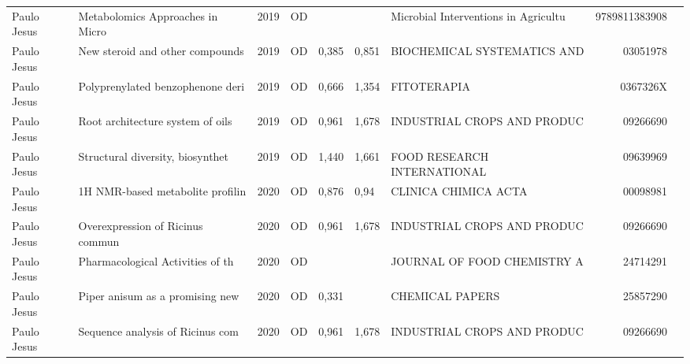 \documentclass[12pt,brazil]{article}\usepackage[]{graphicx}\usepackage[]{xcolor}
\begin{document}
\begin{longtable}{lllrrllrr}
Paulo Jesus & Metabolomics Approaches in Micro & 2019 & OD &  &  & Microbial Interventions in Agricultu & 9789811383908 \\
Paulo Jesus & New steroid and other compounds  & 2019 & OD & 0,385 & 0,851 & BIOCHEMICAL SYSTEMATICS AND & 03051978 \\
Paulo Jesus & Polyprenylated benzophenone deri & 2019 & OD & 0,666 & 1,354 & FITOTERAPIA & 0367326X \\
\rowcolor{coautr}\rowcolor{coautr}\rowcolor{coautr}\rowcolor{coautr}\rowcolor{coautr}\rowcolor{coautr}\rowcolor{coautr}\rowcolor{coautr}\rowcolor{coautr}\rowcolor{coautr}\rowcolor{coautr}\rowcolor{coautr}\rowcolor{coautr}\rowcolor{coautr}\rowcolor{coautr}\rowcolor{coautr}Paulo Jesus & Root architecture system of oils & 2019 & OD & 0,961 & 1,678 & INDUSTRIAL CROPS AND PRODUC & 09266690 \\
Paulo Jesus & Structural diversity, biosynthet & 2019 & OD & 1,440 & 1,661 & FOOD RESEARCH INTERNATIONAL & 09639969 \\
Paulo Jesus & 1H NMR-based metabolite profilin & 2020 & OD & 0,876 & 0,94 & CLINICA CHIMICA ACTA & 00098981 \\
\rowcolor{coautr}\rowcolor{coautr}\rowcolor{coautr}\rowcolor{coautr}\rowcolor{coautr}\rowcolor{coautr}\rowcolor{coautr}\rowcolor{coautr}\rowcolor{coautr}\rowcolor{coautr}\rowcolor{coautr}\rowcolor{coautr}\rowcolor{coautr}\rowcolor{coautr}\rowcolor{coautr}\rowcolor{coautr}Paulo Jesus & Overexpression of Ricinus commun & 2020 & OD & 0,961 & 1,678 & INDUSTRIAL CROPS AND PRODUC & 09266690 \\
Paulo Jesus & Pharmacological Activities of th & 2020 & OD &  &  & JOURNAL OF FOOD CHEMISTRY A & 24714291 \\
\rowcolor{coautr}\rowcolor{coautr}\rowcolor{coautr}\rowcolor{coautr}\rowcolor{coautr}\rowcolor{coautr}\rowcolor{coautr}\rowcolor{coautr}\rowcolor{coautr}\rowcolor{coautr}\rowcolor{coautr}\rowcolor{coautr}\rowcolor{coautr}\rowcolor{coautr}\rowcolor{coautr}\rowcolor{coautr}Paulo Jesus & Piper anisum as a promising new  & 2020 & OD & 0,331 &  & CHEMICAL PAPERS & 25857290 \\
\rowcolor{coautr}\rowcolor{coautr}\rowcolor{coautr}\rowcolor{coautr}\rowcolor{coautr}\rowcolor{coautr}\rowcolor{coautr}\rowcolor{coautr}\rowcolor{coautr}\rowcolor{coautr}\rowcolor{coautr}\rowcolor{coautr}\rowcolor{coautr}\rowcolor{coautr}\rowcolor{coautr}\rowcolor{coautr}Paulo Jesus & Sequence analysis of Ricinus com & 2020 & OD & 0,961 & 1,678 & INDUSTRIAL CROPS AND PRODUC & 09266690 \\

\end{longtable}
\end{document}
